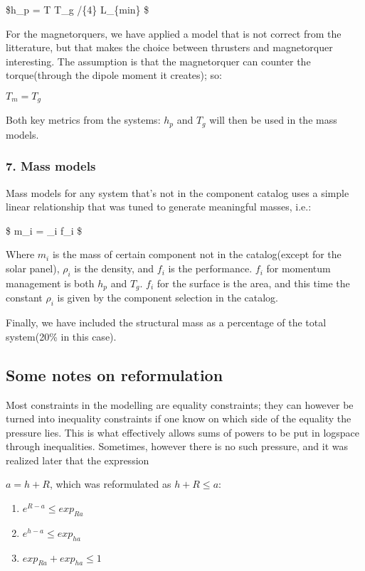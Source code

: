 \documentclass[11pt]{article}
\providecommand{\tightlist}{%
      \setlength{\itemsep}{0pt}\setlength{\parskip}{0pt}}
\begin{document}
\$h\_p = T \cdot T\_g /\{4\}
\cdot L\_\{min\} \$

For the magnetorquers, we have applied a model that is not correct from
the litterature, but that makes the choice between thrusters and
magnetorquer interesting. The assumption is that the magnetorquer can
counter the torque(through the dipole moment it creates); so:

\(T_m = T_g\)

Both key metrics from the systems: \(h_p\) and \(T_g\) will then be used
in the mass models.

    \hypertarget{mass-models}{%
\subsubsection{7. Mass models}\label{mass-models}}

Mass models for any system that's not in the component catalog uses a
simple linear relationship that was tuned to generate meaningful masses,
i.e.:

\$ m\_i = \rho\_i \cdot f\_i \$

Where \(m_i\) is the mass of certain component not in the catalog(except
for the solar panel), \(\rho_i\) is the density, and \(f_i\) is the
performance. \(f_i\) for momentum management is both \(h_p\) and
\(T_g\). \(f_i\) for the surface is the area, and this time the constant
\(\rho_i\) is given by the component selection in the catalog.

Finally, we have included the structural mass as a percentage of the
total system(20\% in this case).

    \hypertarget{some-notes-on-reformulation}{%
\subsection{Some notes on
reformulation}\label{some-notes-on-reformulation}}

Most constraints in the modelling are equality constraints; they can
however be turned into inequality constraints if one know on which side
of the equality the pressure lies. This is what effectively allows sums
of powers to be put in logspace through inequalities. Sometimes, however
there is no such pressure, and it was realized later that the expression

\(a = h + R\), which was reformulated as \(h + R \leq a\):

\begin{enumerate}
\def\labelenumi{\arabic{enumi}.}
\tightlist
\item
  \(e^{R - a} \leq exp_{Ra}\)
\item
  \(e^{h - a} \leq exp_{ha}\)
\item
  \(exp_{Ra} + exp_{ha} \leq 1\)
\end{enumerate}
\end{document}
